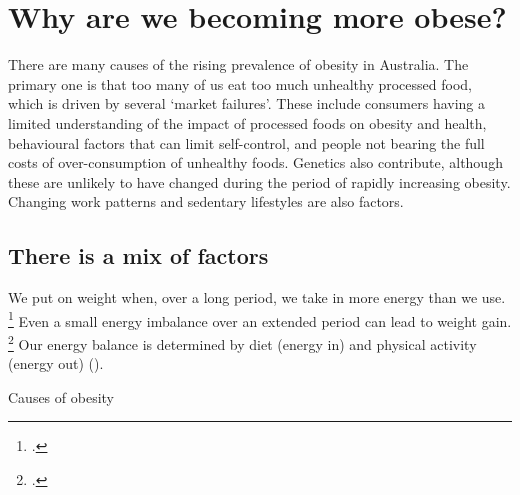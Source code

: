 \documentclass[embargoed]{grattan}
\begin{document}
\chapter{Why are we becoming more obese?}\label{why-are-we-becoming-more-obese}

There are many causes of the rising prevalence of obesity in Australia.
The primary one is that too many of us eat too much unhealthy processed food, which is driven by several `market failures'.
These include consumers having a limited understanding of the impact of processed foods on obesity and health, behavioural factors that can limit self-control, and people not bearing the full costs of over-consumption of unhealthy foods.
Genetics also contribute, although these are unlikely to have changed during the period of rapidly increasing obesity.
Changing work patterns and sedentary lifestyles are also factors.

\section{There is a mix of factors}\label{there-is-a-mix-of-factors}

We put on weight when, over a long period, we take in more energy than we use.%
\footcites{Organization2016ObesityoverweightFact}{Organisation2000Obesitypreventingmanaging}{Ebbeling2002Childhoodobesitypublic}{Swinburn2004Dietnutritionprevention}{Cutler2003WhyhaveAmericans}{Roberto2015Patchyprogressobesity} Even a small energy imbalance over an extended period can lead to weight gain.%
\footcites{Ebbeling2002Childhoodobesitypublic}{Cutler2003WhyhaveAmericans} Our energy balance is determined by diet (energy in) and physical activity (energy out) ().

\begin{table}
\caption{Causes of obesity} \label{tbl:causes-of-obesity}




\end{table}
\end{document}
